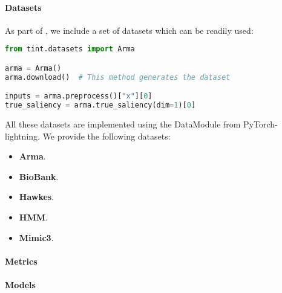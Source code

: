 \paragraph{Datasets}

As part of \texttt{}, we include a set of datasets which can be readily used:

\begin{lstlisting}[language=Python, caption=Python example, label={lst:datasets}]
from tint.datasets import Arma

arma = Arma()
arma.download()  # This method generates the dataset

inputs = arma.preprocess()["x"][0]
true_saliency = arma.true_saliency(dim=1)[0]
\end{lstlisting}

All these datasets are implemented using the DataModule from PyTorch-lightning. We provide the following datasets:

\begin{itemize}
    \item \textbf{Arma}.
    \item \textbf{BioBank}.
    \item \textbf{Hawkes}.
    \item \textbf{HMM}.
    \item \textbf{Mimic3}.
\end{itemize}

\paragraph{Metrics}

\paragraph{Models}

